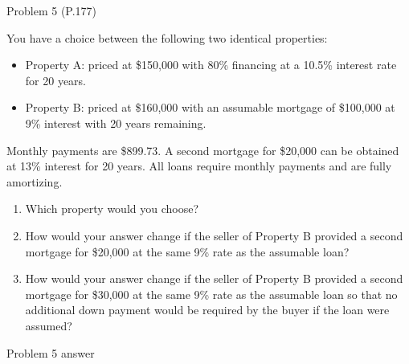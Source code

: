 \documentclass[ignorenonframetext,]{beamer}
\providecommand{\tightlist}{%
\setlength{\itemsep}{0pt}\setlength{\parskip}{0pt}}
\begin{document}
\begin{frame}{Problem 5 (P.177)}

\small

You have a choice between the following two identical properties:

\begin{itemize}
\tightlist
\item
  Property A: priced at \$150,000 with 80\% financing at a 10.5\%
  interest rate for 20 years.
\item
  Property B: priced at \$160,000 with an assumable mortgage of
  \$100,000 at 9\% interest with 20 years remaining.
\end{itemize}

Monthly payments are \$899.73. A second mortgage for \$20,000 can be
obtained at 13\% interest for 20 years. All loans require monthly
payments and are fully amortizing.

\begin{enumerate}
\def\labelenumi{\alph{enumi}.}
\tightlist
\item
  Which property would you choose?
\item
  How would your answer change if the seller of Property B provided a
  second mortgage for \$20,000 at the same 9\% rate as the assumable
  loan?
\item
  How would your answer change if the seller of Property B provided a
  second mortgage for \$30,000 at the same 9\% rate as the assumable
  loan so that no additional down payment would be required by the buyer
  if the loan were assumed?
\end{enumerate}

\small

\end{frame}

\begin{frame}{Problem 5 answer}

\end{frame}
\end{document}
